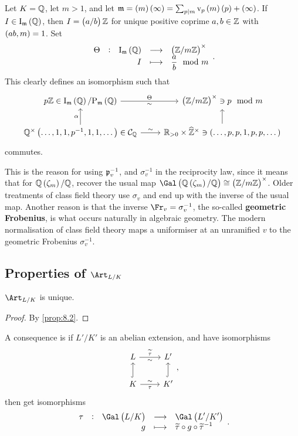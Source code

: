 \begin{example*}
Let $ K = \mathbb{Q} $, let $ m > 1 $, and let $ \mmm = \br{m}\br{\infty} = \sum_{p \mid m} \v_p\br{m}\br{p} + \br{\infty} $. If $ I \in \I_\mmm\br{\QQ} $, then $ I = \br{a / b}\ZZ $ for unique positive coprime $ a, b \in \mathbb{Z} $ with $ \br{ab, m} = 1 $. Set
$$ \function[\Theta]{\I_\mmm\br{\QQ}}{\br{\ZZ / m\ZZ}^\times}{I}{\dfrac{a}{b} \mod m}. $$
This clearly defines an isomorphism such that
$$
\begin{tikzcd}
p\ZZ \in \I_\mmm\br{\QQ} / \P_\mmm\br{\QQ} \arrow{r}{\Theta}[swap]{\sim} & \br{\ZZ / m\ZZ}^\times \ni p \mod m \\
\QQ^\times\br{\dots, 1, 1, p^{-1}, 1, 1, \dots} \in \CCC_\QQ \arrow{u}{\alpha} \arrow{r}{\sim} & \RR_{> 0} \times \widehat{\ZZ}^\times \arrow{u} \ni \br{\dots, p, p, 1, p, p, \dots}
\end{tikzcd}
$$
commutes.
\end{example*}

This is the reason for using $ \mathfrak{p}_v^{-1} $, and $ \sigma_v^{-1} $ in the reciprocity law, since it means that for $ \QQ\br{\zeta_m} / \QQ $, recover the usual map $ \Gal\br{\QQ\br{\zeta_m} / \QQ} \cong \br{\ZZ / m\ZZ}^\times $. Older treatments of class field theory use $ \sigma_v $ and end up with the inverse of the usual map. Another reason is that the inverse $ \Fr_v = \sigma_v^{-1} $, the so-called \textbf{geometric Frobenius}, is what occurs naturally in algebraic geometry. The modern normalisation of class field theory maps a uniformiser at an unramified $ v $ to the geometric Frobenius $ \sigma_v^{-1} $.

\subsection{Properties of \texorpdfstring{$ \Art_{L / K} $}{the Artin map}}


\begin{corollary}[Uniqueness]
$ \Art_{L / K} $ is unique.
\end{corollary}

\begin{proof}
By \ref{prop:8.2}.
\end{proof}

A consequence is if $ L' / K' $ is an abelian extension, and have isomorphisms
$$
\begin{tikzcd}
L \arrow{r}{\widetilde{\tau}}[swap]{\sim} & L' \\
K \arrow[hookrightarrow]{u} \arrow{r}{\sim}[swap]{\tau} & K' \arrow[hookrightarrow]{u}
\end{tikzcd},
$$
then get isomorphisms
$$ \function[\tau]{\Gal\br{L / K}}{\Gal\br{L' / K'}}{g}{\widetilde{\tau} \circ g \circ \widetilde{\tau}^{-1}}. $$

